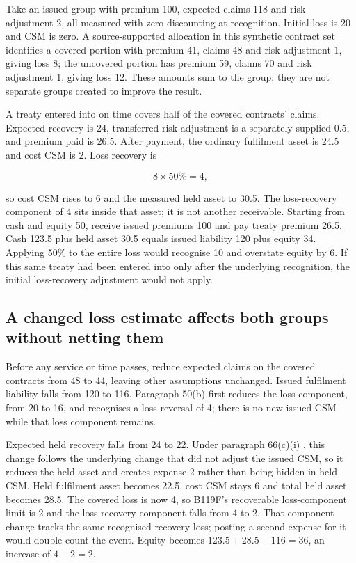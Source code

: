 Take an issued group with premium 100, expected claims 118 and risk adjustment 2, all measured with zero discounting at recognition. Initial loss is 20 and CSM is zero. A source-supported allocation in this synthetic contract set identifies a covered portion with premium 41, claims 48 and risk adjustment 1, giving loss 8; the uncovered portion has premium 59, claims 70 and risk adjustment 1, giving loss 12. These amounts sum to the group; they are not separate groups created to improve the result.

A treaty entered into on time covers half of the covered contracts' claims. Expected recovery is 24, transferred-risk adjustment is a separately supplied 0.5, and premium paid is 26.5. After payment, the ordinary fulfilment asset is 24.5 and cost CSM is 2. Loss recovery is

\[8\times 50\%=4,\]

so cost CSM rises to 6 and the measured held asset to 30.5. The loss-recovery component of 4 sits inside that asset; it is not another receivable. Starting from cash and equity 50, receive issued premiums 100 and pay treaty premium 26.5. Cash 123.5 plus held asset 30.5 equals issued liability 120 plus equity 34. Applying 50\% to the entire loss would recognise 10 and overstate equity by 6. If this same treaty had been entered into only after the underlying recognition, the initial loss-recovery adjustment would not apply.

\hypertarget{a-changed-loss-estimate-affects-both-groups-without-netting-them}{%
\subsection{A changed loss estimate affects both groups without netting them}\label{a-changed-loss-estimate-affects-both-groups-without-netting-them}}

Before any service or time passes, reduce expected claims on the covered contracts from 48 to 44, leaving other assumptions unchanged. Issued fulfilment liability falls from 120 to 116. Paragraph 50(b) first reduces the loss component, from 20 to 16, and recognises a loss reversal of 4; there is no new issued CSM while that loss component remains.

Expected held recovery falls from 24 to 22. Under paragraph 66(c)(i) \citep[IFRS~17.66(c),66(bb),B119F]{eu20231803}, this change follows the underlying change that did not adjust the issued CSM, so it reduces the held asset and creates expense 2 rather than being hidden in held CSM. Held fulfilment asset becomes 22.5, cost CSM stays 6 and total held asset becomes 28.5. The covered loss is now 4, so B119F's recoverable loss-component limit is 2 and the loss-recovery component falls from 4 to 2. That component change tracks the same recognised recovery loss; posting a second expense for it would double count the event. Equity becomes \(123.5+28.5-116=36\), an increase of \(4-2=2\).

